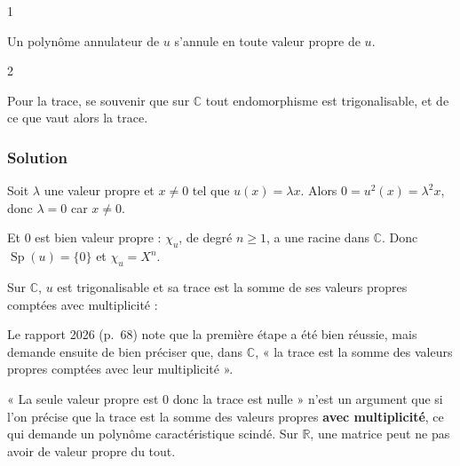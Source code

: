 \documentclass[11pt,a4paper]{article}
\newcommand{\equationajustee}[1]{%
  \sbox{\boiteequation}{$\displaystyle #1$}%
  \ifdim\wd\boiteequation>\linewidth
    \[\resizebox{\linewidth}{!}{\usebox{\boiteequation}}\]%
  \else
    \[#1\]%
  \fi}
\begin{document}
\begin{indication}{1}

Un polynôme annulateur de \(u\) s'annule en toute valeur propre de \(u\).

\end{indication}

\begin{indication}{2}

Pour la trace, se souvenir que sur \(\mathbb C\) tout endomorphisme est trigonalisable, et de ce que vaut alors la trace.

\end{indication}

\hypertarget{solution}{%
\subsubsection{Solution}\label{solution}}

Soit \(\lambda\) une valeur propre et \(x\neq0\) tel que \(u(x)=\lambda x\). Alors \(0=u^2(x)=\lambda^2x\), donc \(\lambda=0\) car \(x\neq0\).

Et \(0\) est bien valeur propre : \(\chi_u\), de degré \(n\ge1\), a une racine dans \(\mathbb C\). Donc \(\operatorname{Sp}(u)=\{0\}\) et \(\chi_u=X^n\).

Sur \(\mathbb C\), \(u\) est trigonalisable et sa trace est la somme de ses valeurs propres comptées avec multiplicité :
\equationajustee{\boxed{\begin{aligned}{}&\operatorname{Sp}(u)=\{0\},\\ &\operatorname{tr}(u)=0.\end{aligned}}}

\begin{jury}

Le rapport 2026 (p.~68) note que la première étape a été bien réussie, mais demande ensuite de bien préciser que, dans \(\mathbb C\), « la trace est la somme des valeurs propres comptées avec leur multiplicité ».

\end{jury}

\begin{piege}

« La seule valeur propre est \(0\) donc la trace est nulle » n'est un argument que si l'on précise que la trace est la somme des valeurs propres \textbf{avec multiplicité}, ce qui demande un polynôme caractéristique scindé. Sur \(\mathbb R\), une matrice peut ne pas avoir de valeur propre du tout.

\end{piege}
\end{document}
